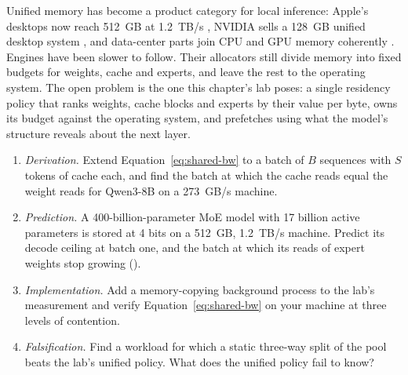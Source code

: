 
Unified memory has become a product category for local inference: Apple's
desktops now reach 512~GB at 1.2~TB/s \cite{apple2026m5ultra}, NVIDIA sells a
128~GB unified desktop system \cite{nvidia2026dgxspark}, and data-center parts
join CPU and GPU memory coherently
\cite{nvidia2022gracehopper,amd2026mi300a}. Engines have been slower to follow.
Their allocators still divide memory into fixed budgets for weights, cache and
experts, and leave the rest to the operating system. The open problem is the
one this chapter's lab poses: a single residency policy that ranks weights,
cache blocks and experts by their value per byte, owns its budget against the
operating system, and prefetches using what the model's structure reveals
about the next layer.

\ExercisesSection

\begin{enumerate}
\item \emph{Derivation.} Extend Equation~\ref{eq:shared-bw} to a batch of $B$
  sequences with $S$ tokens of cache each, and find the batch at which the
  cache reads equal the weight reads for Qwen3-8B on a 273~GB/s machine.
\item \emph{Prediction.} A 400-billion-parameter MoE model with 17 billion
  active parameters is stored at 4 bits on a 512~GB, 1.2~TB/s machine. Predict
  its decode ceiling at batch one, and the batch at which its reads of expert
  weights stop growing ().
\item \emph{Implementation.} Add a memory-copying background process to the
  lab's measurement and verify Equation~\ref{eq:shared-bw} on your machine at
  three levels of contention.
\item \emph{Falsification.} Find a workload for which a static three-way split
  of the pool beats the lab's unified policy. What does the unified policy fail
  to know?
\end{enumerate}
